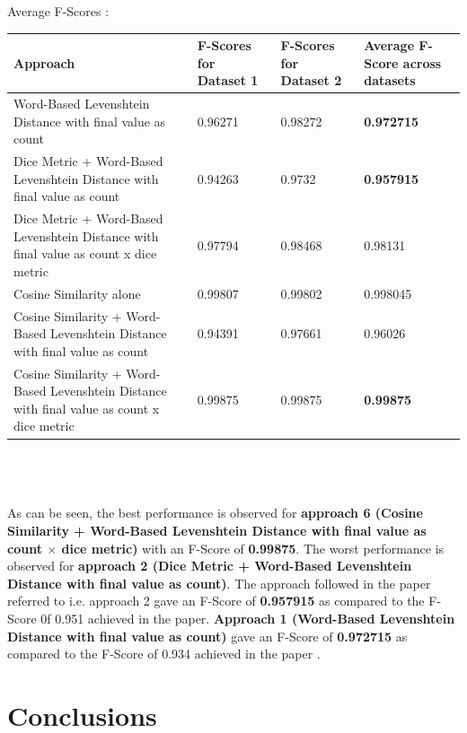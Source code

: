 \documentclass[12pt, a4paper]{article}
\begin{document}
\clearpage
Average F-Scores : 
\begin{center}
  \renewcommand{\arraystretch}{1.5}
  \begin{tabular}{p{5cm}|p{2.5cm}|p{2.5cm}|p{2.5cm}}
    Approach&F-Scores for Dataset 1&F-Scores for Dataset 2&Average F-Score across datasets \\ 
    \hline 
    Word-Based Levenshtein Distance with final value as count&0.96271&0.98272&\textbf{0.972715} \\ 
    Dice Metric + Word-Based Levenshtein Distance with final value as count&0.94263&0.9732&\textbf{0.957915} \\ 
    Dice Metric + Word-Based Levenshtein Distance with final value as count x dice metric&0.97794&0.98468&0.98131 \\ 
    Cosine Similarity alone&0.99807&0.99802&0.998045 \\ 
    Cosine Similarity + Word-Based Levenshtein Distance with final value as count&0.94391&0.97661&0.96026 \\ 
    Cosine Similarity + Word-Based Levenshtein Distance with final value as count x dice metric&0.99875&0.99875&\textbf{0.99875} \\  
\end{tabular}
\end{center} 
\\~\\~\\ 
As can be seen, the best performance is observed for \textbf{approach 6 (Cosine Similarity + Word-Based Levenshtein Distance with final value as count \(\times\) dice metric)} with an F-Score of \textbf{0.99875}. The worst performance is observed for \textbf{approach 2 (Dice Metric + Word-Based Levenshtein Distance with final value as count)}. The approach followed in the paper referred to \cite{maincqa} i.e. approach 2  gave an F-Score of \textbf{0.957915} as compared to the F-Score 0f 0.951 achieved in the paper. \textbf{Approach 1 (Word-Based Levenshtein Distance with final value as count)} gave an F-Score of \textbf{0.972715} as compared to the F-Score of 0.934 achieved in the paper \cite{maincqa}. 

\newpage 
\section{Conclusions} 
\end{document}
